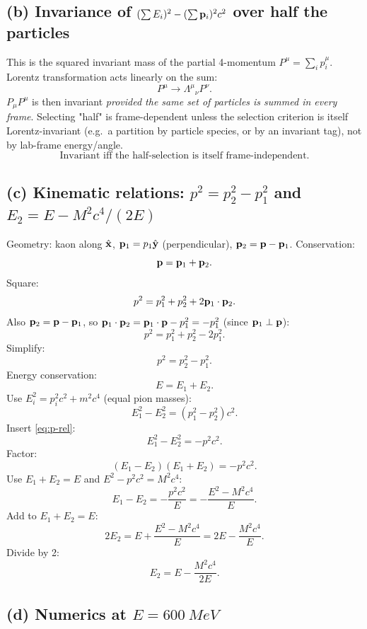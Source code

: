 \documentclass[11pt]{article}
\begin{document}
\subsection*{(b) Invariance of $(\sum E_i)^2-(\sum\vb p_i)^2 c^2$ over half the particles}

This is the squared invariant mass of the partial 4-momentum $P^\mu=\sum_i p_i^\mu$.
Lorentz transformation acts linearly on the sum:
\[ P^\mu\to\Lambda^\mu{}_\nu P^\nu. \]
$P_\mu P^\mu$ is then invariant \emph{provided the same set of particles is summed in every frame}.
Selecting "half" is frame-dependent unless the selection criterion is itself Lorentz-invariant (e.g.\ a partition by particle species, or by an invariant tag), not by lab-frame energy/angle.
\begin{equation}
\boxed{\;\text{Invariant iff the half-selection is itself frame-independent.}\;}
\end{equation}

\subsection*{(c) Kinematic relations: $p^2=p_2^2-p_1^2$ and $E_2=E-M^2c^4/(2E)$}

Geometry: kaon along $\hat{\vb x}$, $\vb p_1=p_1\hat{\vb y}$ (perpendicular), $\vb p_2=\vb p-\vb p_1$.
Conservation:
\[ \vb p = \vb p_1 + \vb p_2. \]
Square:
\[ p^2 = p_1^2 + p_2^2 + 2\vb p_1\cdot\vb p_2. \]
Also $\vb p_2=\vb p-\vb p_1$, so $\vb p_1\cdot\vb p_2=\vb p_1\cdot\vb p-p_1^2=-p_1^2$ (since $\vb p_1\perp\vb p$):
\[ p^2 = p_1^2 + p_2^2 - 2 p_1^2. \]
Simplify:
\begin{equation}
\boxed{\;p^2 = p_2^2 - p_1^2.\;}
\label{eq:p-rel}
\end{equation}
Energy conservation:
\[ E = E_1+E_2. \]
Use $E_i^2=p_i^2 c^2+m^2 c^4$ (equal pion masses):
\[ E_1^2 - E_2^2 = (p_1^2-p_2^2)c^2. \]
Insert \eqref{eq:p-rel}:
\[ E_1^2 - E_2^2 = -p^2 c^2. \]
Factor:
\[ (E_1-E_2)(E_1+E_2) = -p^2 c^2. \]
Use $E_1+E_2=E$ and $E^2-p^2c^2=M^2c^4$:
\[ E_1 - E_2 = -\frac{p^2c^2}{E} = -\frac{E^2-M^2c^4}{E}. \]
Add to $E_1+E_2=E$:
\[ 2E_2 = E + \frac{E^2-M^2c^4}{E} = 2E - \frac{M^2c^4}{E}. \]
Divide by 2:
\begin{equation}
\boxed{\;E_2 = E - \frac{M^2 c^4}{2E}.\;}
\label{eq:E2}
\end{equation}

\subsection*{(d) Numerics at $E=\SI{600}{MeV}$}
\end{document}
